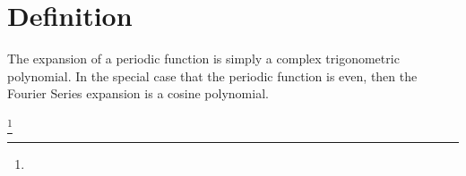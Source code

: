 \section{Definition}
The  expansion of a periodic function 
is simply a complex trigonometric polynomial.
In the special case that the periodic function is even,
then the Fourier Series expansion is a cosine polynomial.

\begin{definition}
\footnote{
  }
\label{def:fs}
\label{def:opFS} 
\end{definition}



